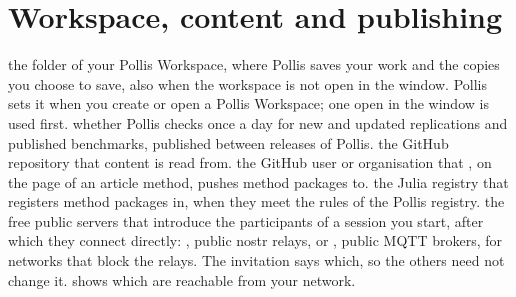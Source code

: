 \section{Workspace, content and publishing}\label{sec:workspace}
\begin{itemize}
    the folder of your Pollis Workspace, where Pollis saves your work and the copies you choose to save, also when the
    workspace is not open in the window. Pollis sets it when you create or open a Pollis Workspace; one open in the
    window is used first.
    whether Pollis checks once a day for new and updated replications and published benchmarks, published between
    releases of Pollis.
    the GitHub repository that content is read from.
    the GitHub user or organisation that , on the page of an article method, pushes method
    packages to.
    the Julia registry that  registers method packages in, when they meet the rules of the
    Pollis registry.
    the free public servers that introduce the participants of a session you start, after which they connect
    directly: , public nostr relays, or , public MQTT brokers, for networks that block the
    relays. The invitation says which, so the others need not change it.  shows which are reachable from your network.
\end{itemize}


